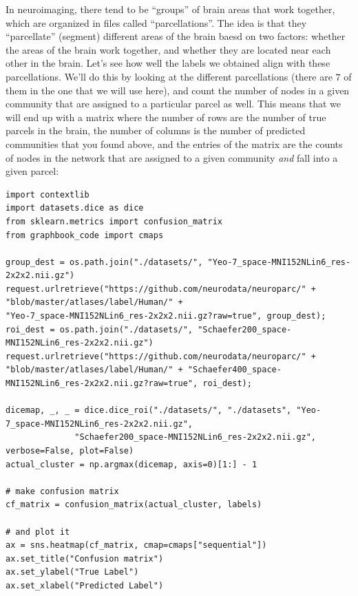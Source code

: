 In neuroimaging, there tend to be ``groups'' of brain areas that work together, which are organized in files called ``parcellations''. The idea is that they ``parcellate'' (segment) different areas of the brain baesd on two factors: whether the areas of the brain work together, and whether they are located near each other in the brain. Let's see how well the labels we obtained align with these parcellations. We'll do this by looking at the different parcellations (there are $7$ of them in the one that we will use here), and count the number of nodes in a given community that are assigned to a particular parcel as well. This means that we will end up with a matrix where the number of rows are the number of true parcels in the brain, the number of columns is the number of predicted communities that you found above, and the entries of the matrix are the counts of nodes in the network that are assigned to a given community \emph{and} fall into a given parcel:

\begin{lstlisting}[style=python]
import contextlib
import datasets.dice as dice
from sklearn.metrics import confusion_matrix
from graphbook_code import cmaps

group_dest = os.path.join("./datasets/", "Yeo-7_space-MNI152NLin6_res-2x2x2.nii.gz")
request.urlretrieve("https://github.com/neurodata/neuroparc/" + "blob/master/atlases/label/Human/" +
"Yeo-7_space-MNI152NLin6_res-2x2x2.nii.gz?raw=true", group_dest);
roi_dest = os.path.join("./datasets/", "Schaefer200_space-MNI152NLin6_res-2x2x2.nii.gz")
request.urlretrieve("https://github.com/neurodata/neuroparc/" + "blob/master/atlases/label/Human/" + "Schaefer400_space-MNI152NLin6_res-2x2x2.nii.gz?raw=true", roi_dest);

dicemap, _, _ = dice.dice_roi("./datasets/", "./datasets", "Yeo-7_space-MNI152NLin6_res-2x2x2.nii.gz", 
              "Schaefer200_space-MNI152NLin6_res-2x2x2.nii.gz", verbose=False, plot=False)
actual_cluster = np.argmax(dicemap, axis=0)[1:] - 1

# make confusion matrix
cf_matrix = confusion_matrix(actual_cluster, labels)

# and plot it
ax = sns.heatmap(cf_matrix, cmap=cmaps["sequential"])
ax.set_title("Confusion matrix")
ax.set_ylabel("True Label")
ax.set_xlabel("Predicted Label")
\end{lstlisting}

